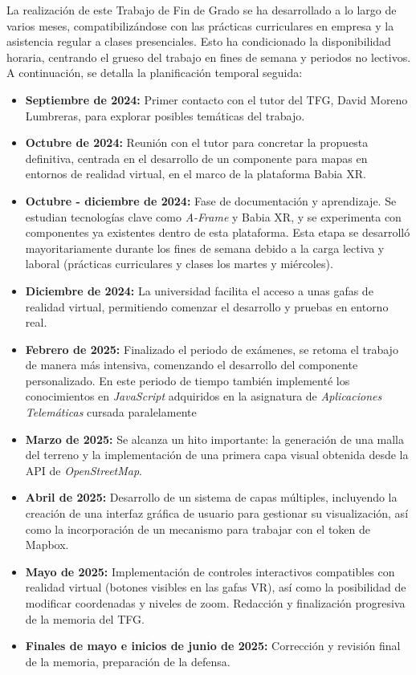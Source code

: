 \documentclass[a4paper, 12pt]{book}
\begin{document}
La realización de este Trabajo de Fin de Grado se ha desarrollado a lo largo de varios meses, compatibilizándose con las prácticas curriculares en empresa y la asistencia regular a clases presenciales. Esto ha condicionado la disponibilidad horaria, centrando el grueso del trabajo en fines de semana y periodos no lectivos. A continuación, se detalla la planificación temporal seguida:

\begin{itemize}
  \item \textbf{Septiembre de 2024:} Primer contacto con el tutor del TFG, David Moreno Lumbreras, para explorar posibles temáticas del trabajo.

  \item \textbf{Octubre de 2024:} Reunión con el tutor para concretar la propuesta definitiva, centrada en el desarrollo de un componente para mapas en entornos de realidad virtual, en el marco de la plataforma Babia XR.

  \item \textbf{Octubre - diciembre de 2024:} Fase de documentación y aprendizaje. Se estudian tecnologías clave como \textit{A-Frame} y Babia XR, y se experimenta con componentes ya existentes dentro de esta plataforma. Esta etapa se desarrolló mayoritariamente durante los fines de semana debido a la carga lectiva y laboral (prácticas curriculares y clases los martes y miércoles).

  \item \textbf{Diciembre de 2024:} La universidad facilita el acceso a unas gafas de realidad virtual, permitiendo comenzar el desarrollo y pruebas en entorno real.

  \item \textbf{Febrero de 2025:} Finalizado el periodo de exámenes, se retoma el trabajo de manera más intensiva, comenzando el desarrollo del componente personalizado. En este periodo de tiempo también implementé los conocimientos en \textit{JavaScript} adquiridos en la asignatura de \textit{Aplicaciones Telemáticas} cursada paralelamente

  \item \textbf{Marzo de 2025:} Se alcanza un hito importante: la generación de una malla del terreno y la implementación de una primera capa visual obtenida desde la API de \textit{OpenStreetMap}.

  \item \textbf{Abril de 2025:} Desarrollo de un sistema de capas múltiples, incluyendo la creación de una interfaz gráfica de usuario para gestionar su visualización, así como la incorporación de un mecanismo para trabajar con el token de Mapbox.

  \item \textbf{Mayo de 2025:} Implementación de controles interactivos compatibles con realidad virtual (botones visibles en las gafas VR), así como la posibilidad de modificar coordenadas y niveles de zoom. Redacción y finalización progresiva de la memoria del TFG.

  \item \textbf{Finales de mayo e inicios de junio de 2025:} Corrección y revisión final de la memoria, preparación de la defensa.
\end{itemize}
\end{document}
